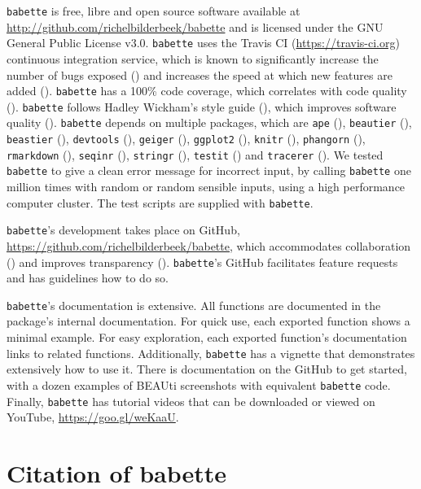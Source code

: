 \documentclass{article}
\begin{document}
\verb;babette; is free, libre and open source software available at 
\url{http://github.com/richelbilderbeek/babette}
and is licensed under the GNU General Public License v3.0.
\verb;babette; uses the Travis CI (\url{https://travis-ci.org})
continuous integration service, which is known to significantly 
increase the number of bugs exposed (\cite{vasilescu2015}) and increases
the speed at which new features are added (\cite{vasilescu2015}).
\verb;babette; has a 100\% code coverage, which correlates with 
code quality (\cite{horgan1994,del1995correlation}). 
\verb;babette; follows Hadley Wickham's style guide (\cite{style_guide}), 
which improves software quality (\cite{fang2001}).
\verb;babette; depends on multiple packages, which are 
\verb;ape; (\cite{APE}), 
\verb;beautier; (\cite{beautier}),
\verb;beastier; (\cite{beastier}),
\verb;devtools; (\cite{devtools}),
\verb;geiger; (\cite{GEIGER}),
\verb;ggplot2; (\cite{ggplot2}),
\verb;knitr; (\cite{knitr}),
\verb;phangorn; (\cite{phangorn}),
\verb;rmarkdown; (\cite{rmarkdown}),
\verb;seqinr; (\cite{seqinr}),
\verb;stringr; (\cite{stringr}),
\verb;testit; (\cite{testit}) and 
\verb;tracerer; (\cite{tracerer}).
We tested \verb;babette; to give a clean 
error message for incorrect input, by
calling \verb;babette; one million times
with random or random sensible inputs, 
using a high performance computer cluster. 
The test scripts are supplied with \verb;babette;.

\verb;babette;'s development takes place on GitHub,
\url{https://github.com/richelbilderbeek/babette}, 
which accommodates collaboration (\cite{perez2016ten}) 
and improves transparency (\cite{gorgolewski2016practical}).
\verb;babette;'s GitHub facilitates feature requests and 
has guidelines how to do so.

\verb;babette;'s documentation is extensive. All functions are documented
in the package's internal documentation. For quick use, 
each exported function shows a minimal example. 
For easy exploration, each exported function's documentation links to related functions.
Additionally, \verb;babette; has a vignette that demonstrates extensively how
to use it. There is documentation on the GitHub to get started, 
with a dozen examples of BEAUti screenshots with equivalent \verb;babette; code.
Finally, \verb;babette; has tutorial videos that can 
be downloaded or viewed on YouTube, \url{https://goo.gl/weKaaU}.

\section{Citation of babette}
\end{document}
